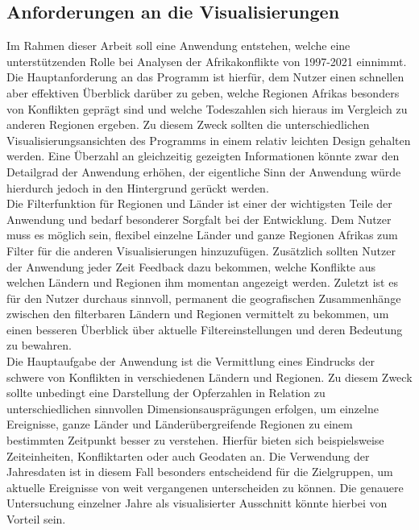 \documentclass[usegeometry=true]{scrartcl}
\begin{document}
\subsection{Anforderungen an die Visualisierungen}
Im Rahmen dieser Arbeit soll eine Anwendung entstehen, welche eine unterstützenden Rolle bei Analysen der Afrikakonflikte von 1997-2021 einnimmt. Die Hauptanforderung an das Programm ist hierfür, dem Nutzer einen schnellen aber effektiven Überblick darüber zu geben, welche Regionen Afrikas besonders von Konflikten geprägt sind und welche Todeszahlen sich hieraus im Vergleich zu anderen Regionen ergeben. Zu diesem Zweck sollten die unterschiedlichen Visualisierungsansichten des Programms in einem relativ \glqq leichten\grqq{} Design gehalten werden. Eine Überzahl an gleichzeitig gezeigten Informationen könnte zwar den Detailgrad der Anwendung erhöhen, der eigentliche Sinn der Anwendung würde hierdurch jedoch in den Hintergrund gerückt werden.\\ Die Filterfunktion für Regionen und Länder ist einer der wichtigsten Teile der Anwendung und bedarf besonderer Sorgfalt bei der Entwicklung. Dem Nutzer muss es möglich sein, flexibel einzelne Länder und ganze Regionen Afrikas zum Filter für die anderen Visualisierungen hinzuzufügen. Zusätzlich sollten Nutzer der Anwendung jeder Zeit Feedback dazu bekommen, welche Konflikte aus welchen Ländern und Regionen ihm momentan angezeigt werden. Zuletzt ist es für den Nutzer durchaus sinnvoll, permanent die geografischen Zusammenhänge zwischen den filterbaren Ländern und Regionen vermittelt zu bekommen, um einen besseren Überblick über aktuelle Filtereinstellungen und deren Bedeutung zu bewahren.\\ Die Hauptaufgabe der Anwendung ist die Vermittlung eines Eindrucks der schwere von Konflikten in verschiedenen Ländern und Regionen. Zu diesem Zweck sollte unbedingt eine Darstellung der Opferzahlen in Relation zu unterschiedlichen sinnvollen Dimensionsausprägungen erfolgen, um einzelne Ereignisse, ganze Länder und Länderübergreifende Regionen zu einem bestimmten Zeitpunkt besser zu verstehen. Hierfür bieten sich beispielsweise Zeiteinheiten, Konfliktarten oder auch Geodaten an. Die Verwendung der Jahresdaten ist in diesem Fall besonders entscheidend für die Zielgruppen, um aktuelle Ereignisse von weit vergangenen unterscheiden zu können. Die genauere Untersuchung einzelner Jahre als \glqq visualisierter Ausschnitt\grqq{} könnte hierbei von Vorteil sein.\\
\end{document}
